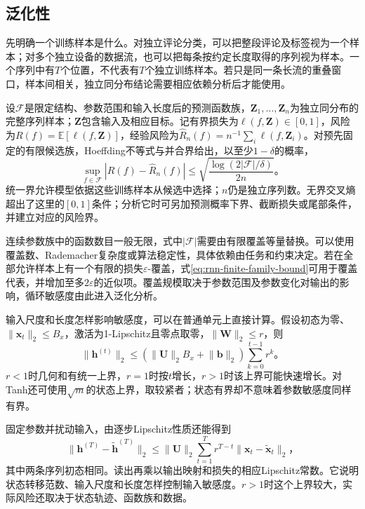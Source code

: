 \subsection{泛化性}
\label{sec:rnn-generalization}

先明确一个训练样本是什么。对独立评论分类，可以把整段评论及标签视为一个样本；对多个独立设备的数据流，也可以把每条按约定长度取得的序列视为样本。一个序列中有$T$个位置，不代表有$T$个独立训练样本。若只是同一条长流的重叠窗口，样本间相关，独立同分布结论需要相应依赖分析后才能使用。

设$\mathcal{F}$是限定结构、参数范围和输入长度后的预测函数族，$\bm{Z}_1,\ldots,\bm{Z}_n$为独立同分布的完整序列样本；$\bm{Z}$包含输入及相应目标。记有界损失为$\ell(f,\bm{Z})\in[0,1]$，风险为$R(f)=\mathbb{E}[\ell(f,\bm{Z})]$，经验风险为$\widehat R_n(f)=n^{-1}\sum_i\ell(f,\bm{Z}_i)$。对预先固定的有限候选族，Hoeffding不等式与并合界给出，以至少$1-\delta$的概率，
\begin{equation}
  \sup_{f\in\mathcal{F}}\left|R(f)-\widehat R_n(f)\right|
    \leq\sqrt{\frac{\log(2|\mathcal{F}|/\delta)}{2n}}\text{。}
  \label{eq:rnn-finite-family-bound}
\end{equation}
统一界允许模型依据这些训练样本从候选中选择；$n$仍是独立序列数。无界交叉熵超出了这里的$[0,1]$条件；分析它时可另加预测概率下界、截断损失或尾部条件，并建立对应的风险界。

连续参数族中的函数数目一般无限，式中$|\mathcal{F}|$需要由有限覆盖等量替换。可以使用覆盖数、Rademacher复杂度或算法稳定性，具体依赖由任务和约束决定。若在全部允许样本上有一个有限的损失$\varepsilon$-覆盖，式\eqref{eq:rnn-finite-family-bound}可用于覆盖代表，并增加至多$2\varepsilon$的近似项。覆盖规模取决于参数范围及参数变化对输出的影响，循环敏感度由此进入泛化分析。

输入尺度和长度怎样影响敏感度，可以在普通单元上直接计算。假设初态为零、$\lVert\bm{x}_t\rVert_2\leq B_x$，激活为1-Lipschitz且零点取零，$\lVert\bm{W}\rVert_2\leq r$，则
\begin{equation}
  \lVert\bm{h}^{(t)}\rVert_2
    \leq\left(\lVert\bm{U}\rVert_2 B_x+\lVert\bm{b}\rVert_2\right)
       \sum_{k=0}^{t-1}r^k\text{。}
  \label{eq:rnn-state-norm-bound}
\end{equation}
$r<1$时几何和有统一上界，$r=1$时按$t$增长，$r>1$时该上界可能快速增长。对Tanh还可使用$\sqrt m$的状态上界，取较紧者；状态有界却不意味着参数敏感度同样有界。

固定参数并扰动输入，由逐步Lipschitz性质还能得到
\begin{equation}
  \lVert\bm{h}^{(T)}-\widetilde{\bm{h}}^{(T)}\rVert_2
    \leq\lVert\bm{U}\rVert_2
      \sum_{t=1}^{T}r^{T-t}\lVert\bm{x}_t-\widetilde{\bm{x}}_t\rVert_2\text{，}
  \label{eq:rnn-input-sensitivity}
\end{equation}
其中两条序列初态相同。读出再乘以输出映射和损失的相应Lipschitz常数。它说明状态转移范数、输入尺度和长度怎样控制输入敏感度。$r>1$时这个上界较大，实际风险还取决于状态轨迹、函数族和数据。

